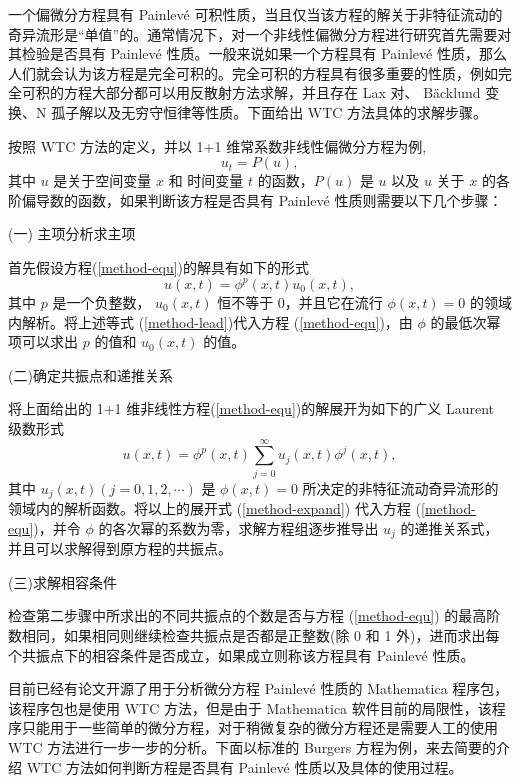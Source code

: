 一个偏微分方程具有 Painlev\'{e} 可积性质，当且仅当该方程的解关于非特征流动的奇异流形是“单值”的。通常情况下，对一个非线性偏微分方程进行研究首先需要对其检验是否具有  Painlev\'{e} 性质。一般来说如果一个方程具有 Painlev\'{e} 性质，那么人们就会认为该方程是完全可积的。完全可积的方程具有很多重要的性质，例如完全可积的方程大部分都可以用反散射方法求解，并且存在 Lax 对、 B\"{a}cklund 变换、N 孤子解以及无穷守恒律等性质。下面给出 WTC 方法具体的求解步骤。

按照 WTC 方法的定义，并以  1+1 维常系数非线性偏微分方程为例,
\begin{equation}
u_t=P(u),\label{method-equ}
\end{equation}
其中 $u$ 是关于空间变量 $x$ 和 时间变量 $t$ 的函数，$P(u)$ 是 $u$ 以及 $u$ 关于 $x$ 的各阶偏导数的函数，如果判断该方程是否具有  Painlev\'{e} 性质则需要以下几个步骤：

(一) 主项分析求主项

首先假设方程(\ref{method-equ})的解具有如下的形式
\begin{equation}
u(x,t)=\phi^p(x,t) u_0(x,t),\label{method-lead}
\end{equation}
其中 $p$ 是一个负整数， $u_0(x,t)$ 恒不等于 0，并且它在流行 $\phi(x,t)=0$ 的领域内解析。将上述等式 (\ref{method-lead})代入方程 (\ref{method-equ})，由 $\phi$ 的最低次幂项可以求出 $p$ 的值和 $u_0(x,t)$ 的值。

(二)确定共振点和递推关系

将上面给出的 1+1 维非线性方程(\ref{method-equ})的解展开为如下的广义 Laurent 级数形式
\begin{equation}
u(x,t)=\phi^p(x,t)\sum_{j=0}^\infty u_j(x,t) \phi^j(x,t),\label{method-expand}
\end{equation}
其中 $u_j(x,t)(j=0,1,2,\cdots)$ 是 $\phi(x,t)=0$ 所决定的非特征流动奇异流形的领域内的解析函数。将以上的展开式 (\ref{method-expand}) 代入方程 (\ref{method-equ})，并令 $\phi$ 的各次幂的系数为零，求解方程组逐步推导出 $u_j$ 的递推关系式，并且可以求解得到原方程的共振点。

(三)求解相容条件

检查第二步骤中所求出的不同共振点的个数是否与方程 (\ref{method-equ}) 的最高阶数相同，如果相同则继续检查共振点是否都是正整数(除 0 和  1 外)，进而求出每个共振点下的相容条件是否成立，如果成立则称该方程具有 Painlev\'{e} 性质。

目前已经有论文开源了用于分析微分方程 Painlev\'{e} 性质的 Mathematica 程序包，该程序包也是使用 WTC 方法，但是由于 Mathematica 软件目前的局限性，该程序只能用于一些简单的微分方程，对于稍微复杂的微分方程还是需要人工的使用 WTC 方法进行一步一步的分析。下面以标准的 Burgers 方程为例，来去简要的介绍 WTC 方法如何判断方程是否具有 Painlev\'{e} 性质以及具体的使用过程。

